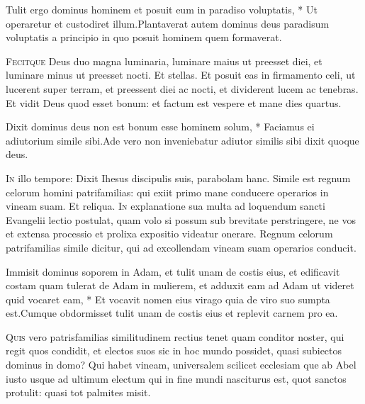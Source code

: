\begin{multicols*}{2}
\begin{responsory}
{Tulit ergo dominus hominem et posuit eum in paradiso voluptatis, * Ut operaretur et custodiret illum.}{Plantaverat autem dominus deus paradisum voluptatis a principio in quo posuit hominem quem formaverat.}
\end{responsory}
\lettrine[lines=2]{\zallmancaps \color{Blue} F}{ecitque} Deus duo magna luminaria, luminare maius ut preesset diei, et luminare minus ut preesset nocti. Et stellas. Et posuit eas in firmamento celi, ut lucerent super terram, et preessent diei ac nocti, et dividerent lucem ac tenebras. Et vidit Deus quod esset bonum: et factum est vespere et mane dies quartus.
\begin{responsory-doxology}
{Dixit dominus deus non est bonum esse hominem solum, * Faciamus ei adiutorium simile sibi.}{Ade vero non inveniebatur adiutor similis sibi dixit quoque deus.}
\end{responsory-doxology}
\lettrine[lines=2]{\zallmancaps \color{Red} I}{n} illo tempore: Dixit Ihesus discipulis suis, parabolam hanc. Simile est regnum celorum homini patrifamilias: qui exiit primo mane conducere operarios in vineam suam. Et reliqua.
\lettrine[lines=2]{\zallmancaps \color{Blue} I}{n} explanatione sua multa ad loquendum sancti Evangelii lectio postulat, quam volo si possum sub brevitate perstringere, ne vos et extensa processio et prolixa expositio videatur onerare. Regnum celorum patrifamilias simile dicitur, qui ad excollendam vineam suam operarios conducit.
\begin{responsory}
{Immisit dominus soporem in Adam, et tulit unam de costis eius, et edificavit costam quam tulerat de Adam in mulierem, et adduxit eam ad Adam ut videret quid vocaret eam, * Et vocavit nomen eius virago quia de viro suo sumpta est.}{Cumque obdormisset tulit unam de costis eius et replevit carnem pro ea.}
\end{responsory}
\lettrine[lines=2]{\zallmancaps \color{Red} Q}{uis} vero patrisfamilias similitudinem rectius tenet quam conditor noster, qui regit quos condidit, et electos suos sic in hoc mundo possidet, quasi subiectos dominus in domo? Qui habet vineam, universalem scilicet ecclesiam que ab Abel iusto usque ad ultimum electum qui in fine mundi nasciturus est, quot sanctos protulit: quasi tot palmites misit.

\end{multicols*}
